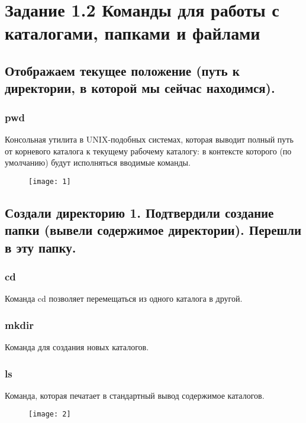 \newpage


\section{Задание 1.2 Команды для работы с каталогами, папками и файлами}

\subsection{Отображаем текущее положение (путь к директории, в которой мы сейчас находимся).}

\subsubsection{pwd}
Консольная утилита в UNIX-подобных системах, которая выводит полный путь от корневого каталога к текущему рабочему каталогу: в контексте которого (по умолчанию) будут исполняться вводимые команды.

\begin{figure}[H]
	\begin{center}
		\texttt{[image: 1]}
		\caption{} 
		\label{pic:pic_4} %
	\end{center}
\end{figure}

\newpage

\subsection{Создали директорию 1. Подтвердили создание папки (вывели содержимое директории). Перешли в эту папку.}

\subsubsection{cd}
Команда cd позволяет перемещаться из одного каталога в другой.
\subsubsection{mkdir}
Команда для создания новых каталогов.
\subsubsection{ls}
Команда, которая печатает в стандартный вывод содержимое каталогов.

\begin{figure}[H]
	\begin{center}
		\texttt{[image: 2]}
		\caption{} 
		\label{pic:pic_5} %
	\end{center}
\end{figure}

